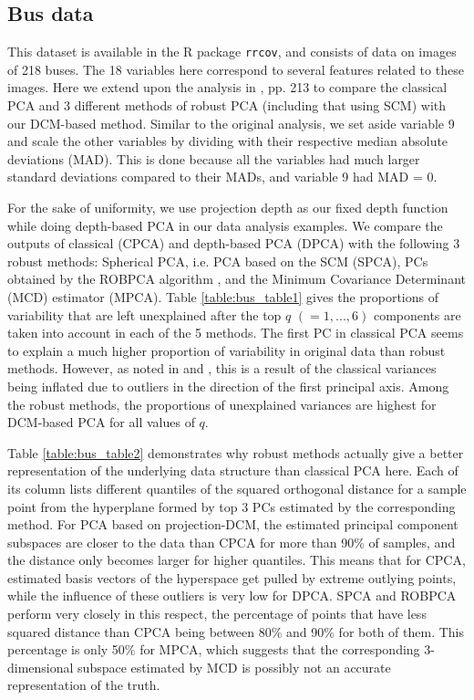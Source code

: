 \documentclass[fleqn,11pt]{article}
\begin{document}
\subsection{Bus data}
This dataset is available in the R package \texttt{rrcov}, and consists of data on images of 218 buses. The 18 variables here correspond to several features related to these images. Here we extend upon the analysis in \cite{maronna06}, pp. 213 to compare the classical PCA and 3 different methods of robust PCA (including that using SCM) with our DCM-based method. Similar to the original analysis, we set aside variable 9 and scale the other variables by dividing with their respective median absolute deviations (MAD). This is done because all the variables had much larger standard deviations compared to their MADs, and variable 9 had MAD = 0.

For the sake of uniformity, we use projection depth as our fixed depth function while doing depth-based PCA in our data analysis examples. We compare the outputs of classical (CPCA) and depth-based PCA (DPCA) with the following 3 robust methods: Spherical PCA, i.e. PCA based on the SCM (SPCA), PCs obtained by the ROBPCA algorithm \citep{hubert05}, and the Minimum Covariance Determinant (MCD) estimator \citep{Rousseeuw84leastmedian} (MPCA). Table \ref{table:bus_table1} gives the proportions of variability that are left unexplained after the top $q$ $(= 1,...,6)$ components are taken into account in each of the 5 methods. The first PC in classical PCA seems to explain a much higher proportion of variability in original data than robust methods. However, as noted in \cite{maronna06} and \cite{hubert05}, this is a result of the classical variances being inflated due to outliers in the direction of the first principal axis. Among the robust methods, the proportions of unexplained variances are highest for DCM-based PCA for all values of $q$.

Table \ref{table:bus_table2} demonstrates why robust methods actually give a better representation of the underlying data structure than classical PCA here. Each of its column lists different quantiles of the squared orthogonal distance for a sample point from the hyperplane formed by top 3 PCs estimated by the corresponding method. For PCA based on projection-DCM, the estimated principal component subspaces are closer to the data than CPCA for more than 90\% of samples, and the distance only becomes larger for higher quantiles. This means that for CPCA, estimated basis vectors of the hyperspace get pulled by extreme outlying points, while the influence of these outliers is very low for DPCA. SPCA and ROBPCA perform very closely in this respect, the percentage of points that have less squared distance than CPCA being between 80\% and 90\% for both of them. This percentage is only 50\% for MPCA, which suggests that the corresponding 3-dimensional subspace estimated by MCD is possibly not an accurate representation of the truth.
\end{document}

